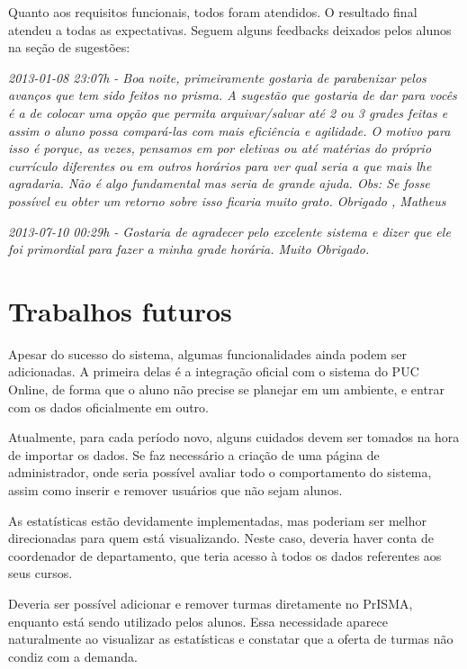 \documentclass[graduacao,brazil]{ThesisPUC}
\begin{document}
Quanto aos requisitos funcionais, todos foram atendidos. O resultado final atendeu a todas as expectativas. Seguem alguns feedbacks deixados pelos alunos na seção de sugestões:

\vspace{3 mm}

\textit{2013-01-08 23:07h - Boa noite, primeiramente gostaria de parabenizar pelos avanços que tem sido feitos no prisma. A sugestão que gostaria de dar para vocês é a de colocar uma opção que permita arquivar/salvar até 2 ou 3 grades feitas e assim o aluno possa compará-las com mais eficiência e agilidade. O motivo para isso é porque, as vezes, pensamos em por eletivas ou até matérias do próprio currículo diferentes ou em outros horários para ver qual seria a que mais lhe agradaria. Não é algo fundamental mas seria de grande ajuda. Obs: Se fosse possível eu obter um retorno sobre isso ficaria muito grato. Obrigado , Matheus}

\vspace{3 mm}

\textit{2013-07-10 00:29h - Gostaria de agradecer pelo excelente sistema e dizer que ele foi primordial para fazer a minha grade horária. Muito Obrigado.}

\vspace{3 mm}


\chapter{Trabalhos futuros}

Apesar do sucesso do sistema, algumas funcionalidades ainda podem ser adicionadas. A primeira delas é a integração oficial com o sistema do PUC Online, de forma que o aluno não precise se planejar em um ambiente, e entrar com os dados oficialmente em outro.

Atualmente, para cada período novo, alguns cuidados devem ser tomados na hora de importar os dados. Se faz necessário a criação de uma página de administrador, onde seria possível avaliar todo o comportamento do sistema, assim como inserir e remover usuários que não sejam alunos.

As estatísticas estão devidamente implementadas, mas poderiam ser melhor direcionadas para quem está visualizando. Neste caso, deveria haver conta de coordenador de departamento, que teria acesso à todos os dados referentes aos seus cursos.

Deveria ser possível adicionar e remover turmas diretamente no PrISMA, enquanto está sendo utilizado pelos alunos. Essa necessidade aparece naturalmente ao visualizar as estatísticas e constatar que a oferta de turmas não condiz com a demanda.
\end{document}
